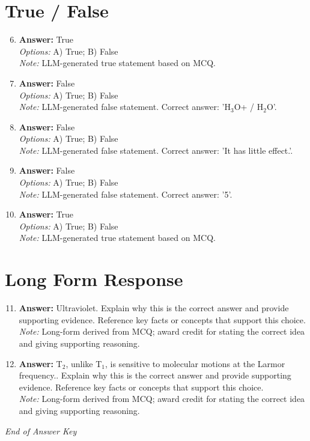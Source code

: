 \documentclass[12pt]{article}
\begin{document}
\section*{True / False}
\begin{enumerate}[label=\arabic*.]
\setcounter{enumi}{5}
\item \textbf{Answer:} True
\\ \textit{Options:} A) True; B) False
\\ \textit{Note:} LLM-generated true statement based on MCQ.
\item \textbf{Answer:} False
\\ \textit{Options:} A) True; B) False
\\ \textit{Note:} LLM-generated false statement. Correct answer: 'H$_{3}$O+ / H$_{2}$O'.
\item \textbf{Answer:} False
\\ \textit{Options:} A) True; B) False
\\ \textit{Note:} LLM-generated false statement. Correct answer: 'It has little effect.'.
\item \textbf{Answer:} False
\\ \textit{Options:} A) True; B) False
\\ \textit{Note:} LLM-generated false statement. Correct answer: '5'.
\item \textbf{Answer:} True
\\ \textit{Options:} A) True; B) False
\\ \textit{Note:} LLM-generated true statement based on MCQ.
\end{enumerate}

\section*{Long Form Response}
\begin{enumerate}[label=\arabic*.]
\setcounter{enumi}{10}
\item \textbf{Answer:} Ultraviolet. Explain why this is the correct answer and provide supporting evidence. Reference key facts or concepts that support this choice.
\\ \textit{Note:} Long-form derived from MCQ; award credit for stating the correct idea and giving supporting reasoning.
\item \textbf{Answer:} T$_{2}$, unlike T$_{1}$, is sensitive to molecular motions at the Larmor frequency.. Explain why this is the correct answer and provide supporting evidence. Reference key facts or concepts that support this choice.
\\ \textit{Note:} Long-form derived from MCQ; award credit for stating the correct idea and giving supporting reasoning.
\end{enumerate}

\vfill
\noindent\textit{End of Answer Key}
\end{document}
